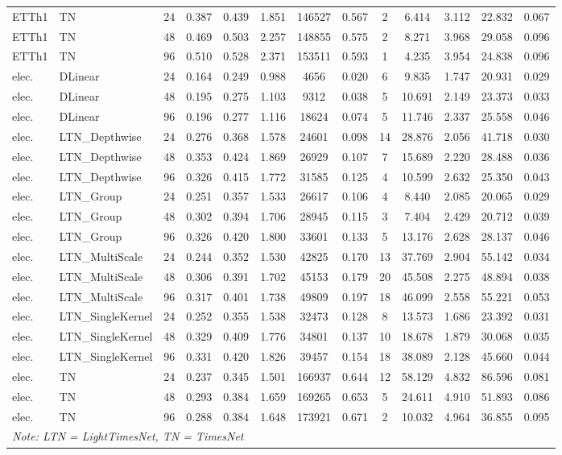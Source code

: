 \begin{table}[!htbp]
\begin{tabular}{llc ccc ccc ccc c}
ETTh1 & TN & 24 & 0.387 & 0.439 & 1.851 & 146527 & 0.567 & 2 & 6.414 & 3.112 & 22.832 & 0.067 \\
ETTh1 & TN & 48 & 0.469 & 0.503 & 2.257 & 148855 & 0.575 & 2 & 8.271 & 3.968 & 29.058 & 0.096 \\
ETTh1 & TN & 96 & 0.510 & 0.528 & 2.371 & 153511 & 0.593 & 1 & 4.235 & 3.954 & 24.838 & 0.096 \\
elec. & DLinear & 24 & 0.164 & 0.249 & 0.988 & 4656 & 0.020 & 6 & 9.835 & 1.747 & 20.931 & 0.029 \\
elec. & DLinear & 48 & 0.195 & 0.275 & 1.103 & 9312 & 0.038 & 5 & 10.691 & 2.149 & 23.373 & 0.033 \\
elec. & DLinear & 96 & 0.196 & 0.277 & 1.116 & 18624 & 0.074 & 5 & 11.746 & 2.337 & 25.558 & 0.046 \\
elec. & LTN\_Depthwise & 24 & 0.276 & 0.368 & 1.578 & 24601 & 0.098 & 14 & 28.876 & 2.056 & 41.718 & 0.030 \\
elec. & LTN\_Depthwise & 48 & 0.353 & 0.424 & 1.869 & 26929 & 0.107 & 7 & 15.689 & 2.220 & 28.488 & 0.036 \\
elec. & LTN\_Depthwise & 96 & 0.326 & 0.415 & 1.772 & 31585 & 0.125 & 4 & 10.599 & 2.632 & 25.350 & 0.043 \\
elec. & LTN\_Group & 24 & 0.251 & 0.357 & 1.533 & 26617 & 0.106 & 4 & 8.440 & 2.085 & 20.065 & 0.029 \\
elec. & LTN\_Group & 48 & 0.302 & 0.394 & 1.706 & 28945 & 0.115 & 3 & 7.404 & 2.429 & 20.712 & 0.039 \\
elec. & LTN\_Group & 96 & 0.326 & 0.420 & 1.800 & 33601 & 0.133 & 5 & 13.176 & 2.628 & 28.137 & 0.046 \\
elec. & LTN\_MultiScale & 24 & 0.244 & 0.352 & 1.530 & 42825 & 0.170 & 13 & 37.769 & 2.904 & 55.142 & 0.034 \\
elec. & LTN\_MultiScale & 48 & 0.306 & 0.391 & 1.702 & 45153 & 0.179 & 20 & 45.508 & 2.275 & 48.894 & 0.038 \\
elec. & LTN\_MultiScale & 96 & 0.317 & 0.401 & 1.738 & 49809 & 0.197 & 18 & 46.099 & 2.558 & 55.221 & 0.053 \\
elec. & LTN\_SingleKernel & 24 & 0.252 & 0.355 & 1.538 & 32473 & 0.128 & 8 & 13.573 & 1.686 & 23.392 & 0.031 \\
elec. & LTN\_SingleKernel & 48 & 0.329 & 0.409 & 1.776 & 34801 & 0.137 & 10 & 18.678 & 1.879 & 30.068 & 0.035 \\
elec. & LTN\_SingleKernel & 96 & 0.331 & 0.420 & 1.826 & 39457 & 0.154 & 18 & 38.089 & 2.128 & 45.660 & 0.044 \\
elec. & TN & 24 & 0.237 & 0.345 & 1.501 & 166937 & 0.644 & 12 & 58.129 & 4.832 & 86.596 & 0.081 \\
elec. & TN & 48 & 0.293 & 0.384 & 1.659 & 169265 & 0.653 & 5 & 24.611 & 4.910 & 51.893 & 0.086 \\
elec. & TN & 96 & 0.288 & 0.384 & 1.648 & 173921 & 0.671 & 2 & 10.032 & 4.964 & 36.855 & 0.095 \\
\bottomrule
\multicolumn{13}{l}{\textit{Note: LTN = LightTimesNet, TN = TimesNet}} \\
\end{tabular}
\end{table}

